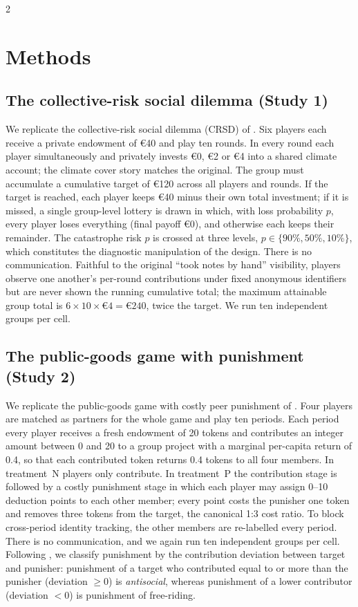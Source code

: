 \documentclass[openacc]{rsproca_new}%
\begin{document}
\begin{multicols}{2}
\section{Methods}

\subsection{The collective-risk social dilemma (Study 1)}
We replicate the collective-risk social dilemma (CRSD) of \textcite{milinski2008climate}. Six players each receive a private endowment of €40 and play ten rounds. In every round each player simultaneously and privately invests €0, €2 or €4 into a shared climate account; the climate cover story matches the original. The group must accumulate a cumulative target of €120 across all players and rounds. If the target is reached, each player keeps €40 minus their own total investment; if it is missed, a single group-level lottery is drawn in which, with loss probability $p$, every player loses everything (final payoff €0), and otherwise each keeps their remainder. The catastrophe risk $p$ is crossed at three levels, $p\in\{90\%,50\%,10\%\}$, which constitutes the diagnostic manipulation of the design. There is no communication. Faithful to the original ``took notes by hand'' visibility, players observe one another's per-round contributions under fixed anonymous identifiers but are never shown the running cumulative total; the maximum attainable group total is $6\times10\times€4=€240$, twice the target. We run ten independent groups per cell.

\subsection{The public-goods game with punishment (Study 2)}
We replicate the public-goods game with costly peer punishment of \textcite{herrmann2008antisocial}. Four players are matched as partners for the whole game and play ten periods. Each period every player receives a fresh endowment of 20 tokens and contributes an integer amount between 0 and 20 to a group project with a marginal per-capita return of 0.4, so that each contributed token returns 0.4 tokens to all four members. In treatment~N players only contribute. In treatment~P the contribution stage is followed by a costly punishment stage in which each player may assign 0--10 deduction points to each other member; every point costs the punisher one token and removes three tokens from the target, the canonical 1:3 cost ratio. To block cross-period identity tracking, the other members are re-labelled every period. There is no communication, and we again run ten independent groups per cell. Following \textcite{herrmann2008antisocial}, we classify punishment by the contribution deviation between target and punisher: punishment of a target who contributed equal to or more than the punisher (deviation $\geq 0$) is \emph{antisocial}, whereas punishment of a lower contributor (deviation $<0$) is punishment of free-riding.


\end{multicols}
\end{document}
